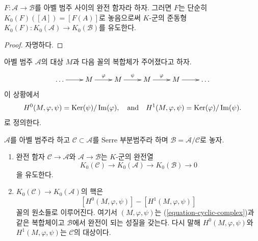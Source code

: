 \begin{lemma}
\label{lemma-exact-functor-K-groups}
$F : \mathcal{A} \to \mathcal{B}$를 아벨 범주 사이의 완전 함자라 하자.
그러면 $F$는 단순히 $K_0(F)([A]) = [F(A)]$로 놓음으로써 $K$-군의
준동형 $K_0(F) : K_0(\mathcal{A}) \to K_0(\mathcal{B})$를 유도한다.
\end{lemma}

\begin{proof}
자명하다.
\end{proof}

\noindent
아벨 범주 $\mathcal{A}$의 대상 $M$과 다음 꼴의 복합체가 주어졌다고
하자.
\begin{equation}
\label{equation-cyclic-complex}
\xymatrix{
\ldots \ar[r] &
M \ar[r]^\varphi &
M \ar[r]^\psi &
M \ar[r]^\varphi &
M \ar[r] & \ldots
}
\end{equation}
이 상황에서
$$
H^0(M, \varphi, \psi) = \mathop{\mathrm{Ker}}(\psi)/\mathop{\mathrm{Im}}(\varphi)
, \quad\text{and}\quad
H^1(M, \varphi, \psi) = \mathop{\mathrm{Ker}}(\varphi)/\mathop{\mathrm{Im}}(\psi).
$$
로 정의한다.

\begin{lemma}
\label{lemma-serre-subcategory-K-groups}
$\mathcal{A}$를 아벨 범주라 하고
$\mathcal{C} \subset \mathcal{A}$를 Serre 부분범주라 하며
$\mathcal{B} = \mathcal{A}/\mathcal{C}$로 놓자.
\begin{enumerate}
\item 완전 함자 $\mathcal{C} \to \mathcal{A}$와
$\mathcal{A} \to \mathcal{B}$는 $K$-군의 완전열
$$
K_0(\mathcal{C}) \to
K_0(\mathcal{A}) \to
K_0(\mathcal{B}) \to
0
$$
을 유도한다.
\item $K_0(\mathcal{C}) \to K_0(\mathcal{A})$의 핵은
$$
[H^0(M, \varphi, \psi)] - [H^1(M, \varphi, \psi)]
$$
꼴의 원소들로 이루어진다. 여기서 $(M, \varphi, \psi)$는
(\ref{equation-cyclic-complex})과 같은 복합체이고
$\mathcal{B}$에서 완전이 되는 성질을 갖는다. 다시 말해
$H^0(M, \varphi, \psi)$와 $H^1(M, \varphi, \psi)$는
$\mathcal{C}$의 대상이다.
\end{enumerate}
\end{lemma}

